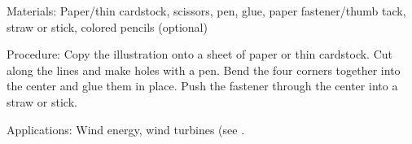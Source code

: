 \begin{multicols}{2}
\begin{description*}
\item[Materials:]{Paper/thin cardstock, scissors, pen, glue, paper fastener/thumb tack, straw or stick, colored pencils (optional)}
\item[Procedure:]{Copy the illustration onto a sheet of paper or thin cardstock. Cut along the lines and make holes with a pen. Bend the four corners together into the center and glue them in place. Push the fastener through the center into a straw or stick.}
\item[Applications:]{Wind energy, wind turbines (see .}
\end{description*}

%
%





\end{multicols}
